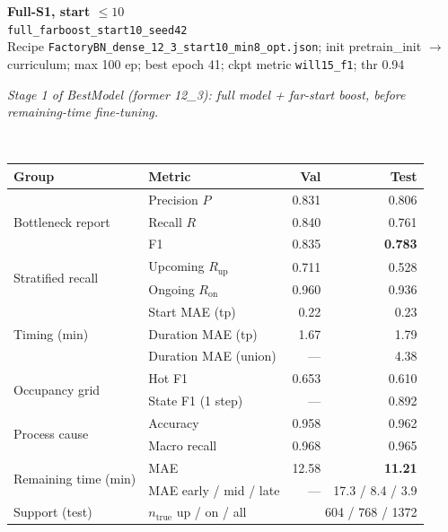 \documentclass[9pt,a4paper,twocolumn]{extarticle}
\begin{document}
\noindent\begin{minipage}{\columnwidth}
\begin{center}
{\small\bfseries Full-S1, start $\le 10$}\\
{\scriptsize\texttt{full\_farboost\_start10\_seed42}}\\
{\scriptsize Recipe \texttt{FactoryBN\_dense\_12\_3\_start10\_min8\_opt.json}; init pretrain\_init $\to$ curriculum; max 100 ep; best epoch 41; ckpt metric \texttt{will15\_f1}; thr 0.94}\\[1pt]
\parbox{0.96\columnwidth}{\scriptsize\itshape Stage 1 of BestModel (former 12\_3): full model + far-start boost, before remaining-time fine-tuning.}\\[2pt]
\scriptsize\setlength{\tabcolsep}{3pt}
\begin{tabular}{llrr}
\toprule
Group & Metric & Val & Test \\
\midrule
\multirow{3}{*}{Bottleneck report}
  & Precision $P$ & 0.831 & 0.806 \\
  & Recall $R$ & 0.840 & 0.761 \\
  & F1 & 0.835 & \textbf{0.783} \\
\midrule
\multirow{2}{*}{Stratified recall}
  & Upcoming $R_{\mathrm{up}}$ & 0.711 & 0.528 \\
  & Ongoing $R_{\mathrm{on}}$ & 0.960 & 0.936 \\
\midrule
\multirow{3}{*}{Timing (min)}
  & Start MAE (tp) & 0.22 & 0.23 \\
  & Duration MAE (tp) & 1.67 & 1.79 \\
  & Duration MAE (union) & --- & 4.38 \\
\midrule
\multirow{2}{*}{Occupancy grid}
  & Hot F1 & 0.653 & 0.610 \\
  & State F1 (1 step) & --- & 0.892 \\
\midrule
\multirow{2}{*}{Process cause}
  & Accuracy & 0.958 & 0.962 \\
  & Macro recall & 0.968 & 0.965 \\
\midrule
\multirow{2}{*}{Remaining time (min)}
  & MAE & 12.58 & \textbf{11.21} \\
  & MAE early / mid / late & --- & 17.3 / 8.4 / 3.9 \\
\midrule
Support (test)
  & $n_{\mathrm{true}}$ up / on / all & \multicolumn{2}{r}{604 / 768 / 1372} \\
\bottomrule
\end{tabular}
\end{center}
\end{minipage}\par\vspace{6pt}
\end{document}
